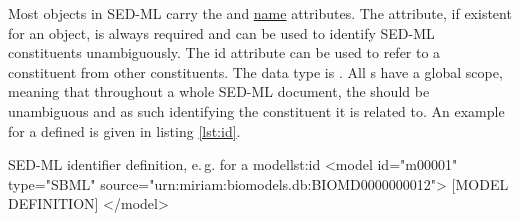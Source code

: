 \label{sec:id}
%

Most objects in SED-ML carry the  and \hyperref[sec:name]{name} attributes. 
The  attribute, if existent for an object, is always required and can be used to identify SED-ML constituents unambiguously.  The {id} attribute can be used to refer to a constituent from other constituents. 
The  data type is . All s have a global scope, meaning that throughout a whole SED-ML document, the  should be unambiguous and as such identifying the constituent it is related to.
An example for a defined  is given in listing \ref{lst:id}.
%
\begin{myXmlLst}{SED-ML identifier definition, e.\,g. for a model}{lst:id}
<model id="m00001" type="SBML" source="urn:miriam:biomodels.db:BIOMD0000000012">
 [MODEL DEFINITION]
</model>
\end{myXmlLst}
%

